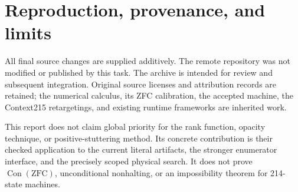 \documentclass[11pt]{article}
\newcommand{\Con}{\operatorname{Con}}
\begin{document}
\section{Reproduction, provenance, and limits}



All final source changes are supplied additively. The remote repository was not modified or published by this task. The archive is intended for review and subsequent integration. Original source licenses and attribution records are retained; the numerical calculus, its ZFC calibration, the accepted machine, the Context215 retargetings, and existing runtime frameworks are inherited work.

This report does not claim global priority for the rank function, opacity technique, or positive-stuttering method. Its concrete contribution is their checked application to the current literal artifacts, the stronger enumerator interface, and the precisely scoped physical search. It does not prove \(\Con(\mathrm{ZFC})\), unconditional nonhalting, or an impossibility theorem for 214-state machines.
\end{document}

